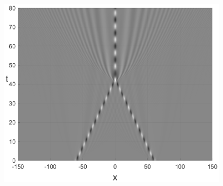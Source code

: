 \documentclass[14pt,a4paper]{extreport}
\begin{document}
\begin{figure}[H]
\begin{minipage}[h]{0.32\linewidth}
				\end{minipage}
				\begin{minipage}[h]{0.32\linewidth}
					\includegraphics[width=1\linewidth]{fig59.eps}
				\end{minipage}


\end{figure}
\end{document}
